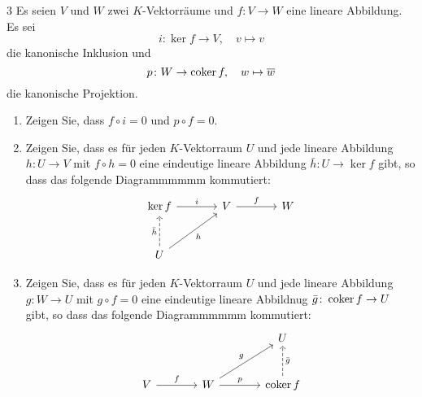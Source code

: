 \begin{question}[subtitle = Die Universelle Eigenschaft des Kerns und des Cokerns]{3}
  Es seien $V$ und $W$ zwei $K$-Vektorräume und $f \colon V \to W$ eine lineare Abbildung.
  Es sei
  \[
    i \colon \ker f \to V,
    \quad
    v \mapsto v
  \]
  die kanonische Inklusion und
  \[
    p \colon W \to \operatorname{coker} f,
    \quad
    w \mapsto \overline{w}
  \]
  die kanonische Projektion.
  \begin{enumerate}[leftmargin=*]
    \item
      Zeigen Sie, dass $f \circ i = 0$ und $p \circ f = 0$.
    \item
      Zeigen Sie, dass es für jeden $K$-Vektorraum $U$ und jede lineare Abbildung $h \colon U \to V$ mit $f \circ h = 0$ eine eindeutige lineare Abbildung $\bar{h} \colon U \to \ker f$ gibt, so dass das folgende Diagrammmmmm kommutiert:
      \[
        \begin{tikzcd}[row sep = large, column sep = large, ampersand replacement = \&]
                \ker f  \arrow{r}{i}
            \&  V       \arrow{r}{f}
            \&  W
          \\
                U       \arrow[swap]{ru}{h}
                        \arrow[dashed]{u}{\bar{h}}
            \&  {}
            \&  {}
        \end{tikzcd}
      \]
    \item
      Zeigen Sie, dass es für jeden $K$-Vektorraum $U$ und jede lineare Abbildung $g \colon W \to U$ mit $g \circ f = 0$ eine eindeutige lineare Abbildnug $\bar{g} \colon \operatorname{coker} f \to U$ gibt, so dass das folgende Diagrammmmmm kommutiert:
      \[
        \begin{tikzcd}[row sep = large, column sep = large, ampersand replacement = \&]
                {}
            \&  {}
            \&  U
          \\
                V         \arrow{r}{f}
            \&  W         \arrow{r}{p}
                          \arrow{ru}{g}
            \&  \coker f  \arrow[swap, dashed]{u}{\bar{g}}
        \end{tikzcd}
      \]
  \end{enumerate}
\end{question}







